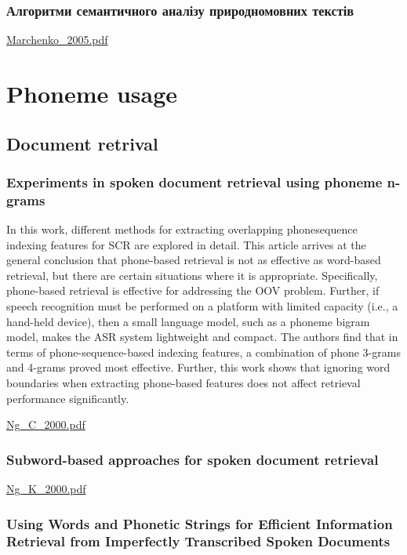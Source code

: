 \subsection{Алгоритми семантичного аналізу природномовних текстів}

\url{Marchenko_2005.pdf}\cite{Marchenko_2005}

\chapter{Phoneme usage}

\section{Document retrival}

\subsection{Experiments in spoken document retrieval using phoneme n-grams}

In this work, different methods for extracting overlapping phonesequence
indexing features for SCR are explored in detail. This article
arrives at the general conclusion that phone-based retrieval is not
as effective as word-based retrieval, but there are certain situations
where it is appropriate. Specifically, phone-based retrieval is effective
for addressing the OOV problem. Further, if speech recognition must
be performed on a platform with limited capacity (i.e., a hand-held
device), then a small language model, such as a phoneme bigram model,
makes the ASR system lightweight and compact. The authors
find that in terms of phone-sequence-based indexing features, a combination
of phone 3-grams and 4-grams proved most effective.
Further, this work shows that ignoring word boundaries when extracting
phone-based features does not affect retrieval performance significantly.

\url{Ng_C_2000.pdf}\cite{Ng_C_2000}

\subsection{Subword-based approaches for spoken document retrieval}

\url{Ng_K_2000.pdf}\cite{Ng_K_2000}

\subsection{Using Words and Phonetic Strings for Efficient Information Retrieval from Imperfectly Transcribed Spoken Documents}

